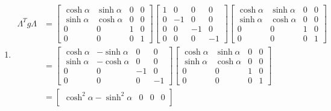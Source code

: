 \documentclass{article}
\begin{document}
\bigskip
\par
\begin{prob}
\end{prob}
\begin{enumerate}[label=(\alph*)]
    \item \begin{align*}
            \Lambda^T g \Lambda &= \begin{bmatrix}
                \cosh \alpha & \sinh \alpha & 0 & 0 \\
                \sinh \alpha & \cosh \alpha & 0 & 0 \\
                0 & 0 & 1 & 0 \\
                0 & 0 & 0 & 1
            \end{bmatrix} \begin{bmatrix}
                1 & 0 & 0 & 0 \\
                0 & -1 & 0 & 0 \\
                0 & 0 & -1 & 0 \\
                0 & 0 & 0 & -1
            \end{bmatrix} \begin{bmatrix}
                \cosh \alpha & \sinh \alpha & 0 & 0 \\
                \sinh \alpha & \cosh \alpha & 0 & 0 \\
                0 & 0 & 1 & 0 \\
                0 & 0 & 0 & 1
            \end{bmatrix} \\
            &= \begin{bmatrix}
                \cosh \alpha & -\sinh \alpha & 0 & 0 \\
                \sinh \alpha & -\cosh \alpha & 0 & 0 \\
                0 & 0 & -1 & 0 \\
                0 & 0 & 0 & -1
            \end{bmatrix} \begin{bmatrix}
                \cosh \alpha & \sinh \alpha & 0 & 0 \\
                \sinh \alpha & \cosh \alpha & 0 & 0 \\
                0 & 0 & 1 & 0 \\
                0 & 0 & 0 & 1
            \end{bmatrix} \\
            &= \begin{bmatrix}
                \cosh^2 \alpha - \sinh^2 \alpha & 0 & 0 & 0 \\

\end{bmatrix}
\end{align*}
\end{enumerate}
\end{document}
